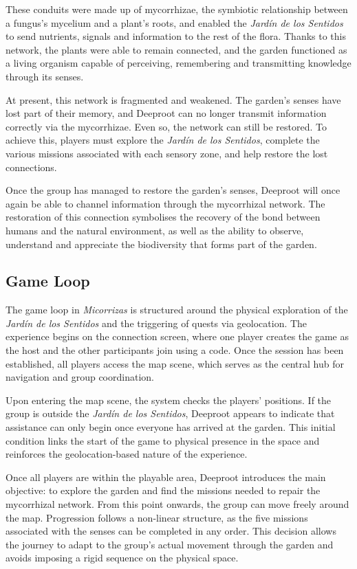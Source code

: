 These conduits were made up of mycorrhizae, the symbiotic relationship between a fungus’s mycelium and a plant’s roots, and enabled the \textit{Jardín de los Sentidos} to send nutrients, signals and information to the rest of the flora. Thanks to this network, the plants were able to remain connected, and the garden functioned as a living organism capable of perceiving, remembering and transmitting knowledge through its senses.

At present, this network is fragmented and weakened. The garden’s senses have lost part of their memory, and Deeproot can no longer transmit information correctly via the mycorrhizae. Even so, the network can still be restored. To achieve this, players must explore the \textit{Jardín de los Sentidos}, complete the various missions associated with each sensory zone, and help restore the lost connections.

Once the group has managed to restore the garden’s senses, Deeproot will once again be able to channel information through the mycorrhizal network. The restoration of this connection symbolises the recovery of the bond between humans and the natural environment, as well as the ability to observe, understand and appreciate the biodiversity that forms part of the garden.


\subsection{Game Loop}
The game loop in \textit{Micorrizas} is structured around the physical exploration of the \textit{Jardín de los Sentidos} and the triggering of quests via geolocation. The experience begins on the connection screen, where one player creates the game as the host and the other participants join using a code. Once the session has been established, all players access the map scene, which serves as the central hub for navigation and group coordination.

Upon entering the map scene, the system checks the players’ positions. If the group is outside the \textit{Jardín de los Sentidos}, Deeproot appears to indicate that assistance can only begin once everyone has arrived at the garden. This initial condition links the start of the game to physical presence in the space and reinforces the geolocation-based nature of the experience.

Once all players are within the playable area, Deeproot introduces the main objective: to explore the garden and find the missions needed to repair the mycorrhizal network. From this point onwards, the group can move freely around the map. Progression follows a non-linear structure, as the five missions associated with the senses can be completed in any order. This decision allows the journey to adapt to the group’s actual movement through the garden and avoids imposing a rigid sequence on the physical space.


